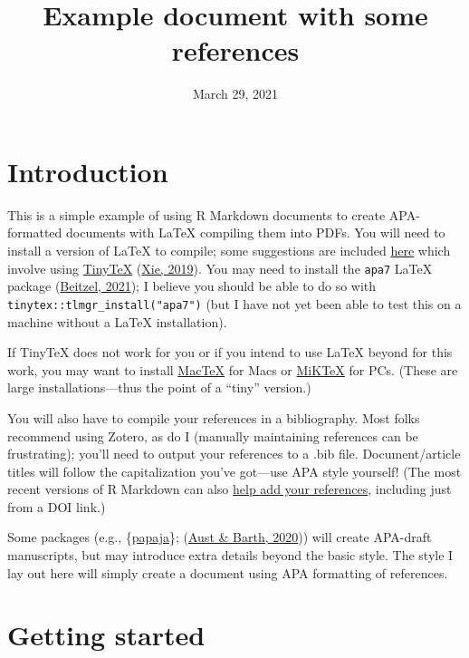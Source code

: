 \documentclass[jou]{apa7}
\title{Example document with some references}
\date{March 29, 2021}
\begin{document}
\maketitle

\hypertarget{introduction}{%
\section{Introduction}\label{introduction}}

This is a simple example of using R Markdown documents to create
APA-formatted documents with LaTeX compiling them into PDFs. You will
need to install a version of LaTeX to compile; some suggestions are
included
\href{https://bookdown.org/yihui/rmarkdown-cookbook/install-latex.html}{here}
which involve using \href{https://yihui.org/tinytex/}{TinyTeX}
(\protect\hyperlink{ref-xie2019}{Xie, 2019}). You may need to install
the \texttt{apa7} LaTeX package
(\protect\hyperlink{ref-weiss2021}{Beitzel, 2021}); I believe you should
be able to do so with \texttt{tinytex::tlmgr\_install("apa7")} (but I
have not yet been able to test this on a machine without a LaTeX
installation).

If TinyTeX does not work for you or if you intend to use LaTeX beyond
for this work, you may want to install
\href{http://tug.org/mactex/}{MacTeX} for Macs or
\href{https://miktex.org/}{MiKTeX} for PCs. (These are large
installations---thus the point of a ``tiny'' version.)

You will also have to compile your references in a bibliography. Most
folks recommend using Zotero, as do I (manually maintaining references
can be frustrating); you'll need to output your references to a .bib
file. Document/article titles will follow the capitalization you've
got---use APA style yourself! (The most recent versions of R Markdown
can also
\href{https://rmarkdown.rstudio.com/authoring_bibliographies_and_citations.html}{help
add your references}, including just from a DOI link.)

Some packages (e.g., \{\href{https://github.com/crsh/papaja}{papaja}\};
(\protect\hyperlink{ref-austbarth2020}{Aust \& Barth, 2020})) will
create APA-draft manuscripts, but may introduce extra details beyond the
basic style. The style I lay out here will simply create a document
using APA formatting of references.

\hypertarget{getting-started}{%
\section{Getting started}\label{getting-started}}
\end{document}
